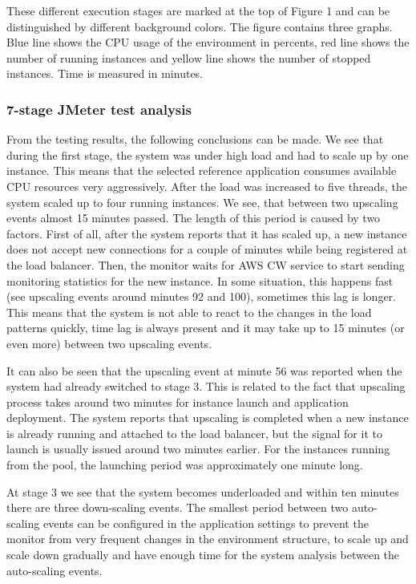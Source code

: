 \documentclass[conference]{IEEEtran}
\begin{document}
These different execution stages are marked at the top of Figure 1 and can be distinguished by different background colors. The figure contains three graphs. Blue line shows the CPU usage of the environment in percents, red line shows the number of running instances and yellow line shows the number of stopped instances. Time is measured in minutes. 

\subsubsection{7-stage JMeter test analysis}

From the testing results, the following conclusions can be made. We see that during the first stage, the system was under high load and had to scale up by one instance. This means that the selected reference application consumes available CPU resources very aggressively. After the load was increased to five threads, the system scaled up to four running instances. We see, that between two upscaling events almost 15 minutes passed. The length of this period is caused by two factors. First of all, after the system reports that it has scaled up, a new instance does not accept new connections for a couple of minutes while being registered at the load balancer. Then, the monitor waits for AWS CW service to start sending monitoring statistics for the new instance. In some situation, this happens fast (see upscaling events around minutes 92 and 100), sometimes this lag is longer. This means that the system is not able to react to the changes in the load patterns quickly, time lag is always present and it may take up to 15 minutes (or even more) between two upscaling events.

It can also be seen that the upscaling event at minute 56 was reported when the system had already switched to stage 3. This is related to the fact that upscaling process takes around two minutes for instance launch and application deployment. The system reports that upscaling is completed when a new instance is already running and attached to the load balancer, but the signal for it to launch is usually issued around two minutes earlier. For the instances running from the pool, the launching period was approximately one minute long.

At stage 3 we see that the system becomes underloaded and within ten minutes there are three down-scaling events. The smallest period between two auto-scaling events can be configured in the application settings to prevent the monitor from very frequent changes in the environment structure, to scale up and scale down gradually and have enough time for the system analysis between the auto-scaling events. 
\end{document}
